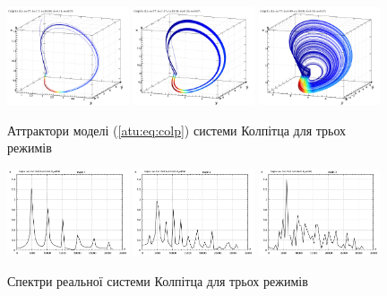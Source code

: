 \begin{figure}[htb!]
 \centerline{
   \includegraphics[width=0.32\textwidth]{p/mod/colp_0-p_xyz_b=1x70.png}
   \includegraphics[width=0.32\textwidth]{p/mod/colp_0-p_xyz_b=1x37.png}
   \includegraphics[width=0.32\textwidth]{p/mod/colp_0-p_xyz_b=0x99.png}
 }
  \caption{Аттрактори моделі (\ref{atu:eq:colp}) системи Колпітца для трьох режимів}
  \label{atu:f:colp_model_xyz}
\end{figure}

\begin{figure}[htb!]
 \centerline{
   \includegraphics[width=0.32\textwidth]{p/mod/colp_m1_f.png}
   \includegraphics[width=0.32\textwidth]{p/mod/colp_m2_f.png}
   \includegraphics[width=0.32\textwidth]{p/mod/colp_m3_f.png}
 }
\caption{Спектри реальної системи Колпітца для трьох режимів}
\label{atu:f:colp_real_f}
\end{figure}

